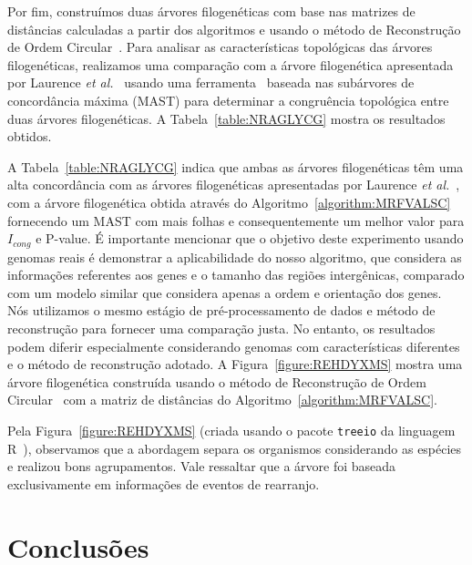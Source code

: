 Por fim, construímos duas árvores filogenéticas com base nas matrizes de distâncias calculadas a partir dos algoritmos e usando o método de Reconstrução de Ordem Circular~\cite{makarenkov1997tree}. Para analisar as características topológicas das árvores filogenéticas, realizamos uma comparação com a árvore filogenética apresentada por Laurence \textit{et al.}~\cite{garczarek2020cyanorak} usando uma ferramenta~\cite{de2007congruence} baseada nas subárvores de concordância máxima (MAST) para determinar a congruência topológica entre duas árvores filogenéticas. A Tabela~\ref{table:NRAGLYCG} mostra os resultados obtidos.



A Tabela~\ref{table:NRAGLYCG} indica que ambas as árvores filogenéticas têm uma alta concordância com as árvores filogenéticas apresentadas por Laurence \textit{et al.}~\cite{garczarek2020cyanorak}, com a árvore filogenética obtida através do Algoritmo~\ref{algorithm:MRFVALSC} fornecendo um MAST com mais folhas e consequentemente um melhor valor para $I_{cong}$ e P-value. É importante mencionar que o objetivo deste experimento usando genomas reais é demonstrar a aplicabilidade do nosso algoritmo, que considera as informações referentes aos genes e o tamanho das regiões intergênicas, comparado com um modelo similar que considera apenas a ordem e orientação dos genes. Nós utilizamos o mesmo estágio de pré-processamento de dados e método de reconstrução para fornecer uma comparação justa. No entanto, os resultados podem diferir especialmente considerando genomas com características diferentes e o método de reconstrução adotado. A Figura~\ref{figure:REHDYXMS} mostra uma árvore filogenética construída usando o método de Reconstrução de Ordem Circular~\cite{makarenkov1997tree} com a matriz de distâncias do Algoritmo~\ref{algorithm:MRFVALSC}.



Pela Figura~\ref{figure:REHDYXMS} (criada usando o pacote \texttt{treeio} da linguagem R~\cite{wang2020treeio}), observamos que a abordagem separa os organismos considerando as espécies e realizou bons agrupamentos. Vale ressaltar que a árvore foi baseada exclusivamente em informações de eventos de rearranjo.

\section{Conclusões}

